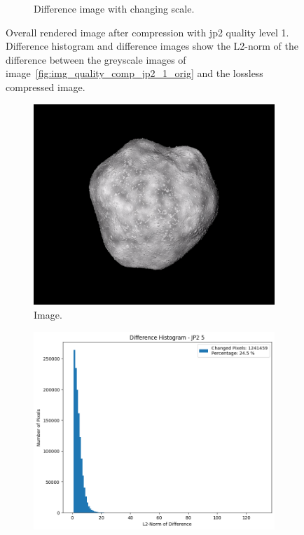 \begin{figure}[htb]
\begin{subfigure}[b]{0.48\textwidth}
        \caption{Difference image with changing scale.}
        \label{fig:img_quality_comp_jp2_1_diff_rel}
    \end{subfigure}
    \caption{Overall rendered image after compression with \gls{jp2} quality level 1. Difference histogram and difference images show the L2-norm of the difference between the greyscale images of image~\ref{fig:img_quality_comp_jp2_1_orig} and the lossless compressed image.}
    \label{fig:img_quality_comp_jp2_1}
\end{figure}


\begin{figure}[htb]
    \centering
    \begin{subfigure}[b]{0.48\textwidth}
        \centering
        \includegraphics[width=\textwidth]{doc/thesis/0_figures/compare_quality/set1/jp2_5.png}
        \caption{Image.}
        \label{fig:img_quality_comp_jp2_5_orig}
    \end{subfigure}
    \begin{subfigure}[b]{0.48\textwidth}
        \centering
        \includegraphics[width=\textwidth]{doc/thesis/0_figures/compare_quality/set1/jp2_5_diff_histogram.png}

\end{subfigure}
\end{figure}
